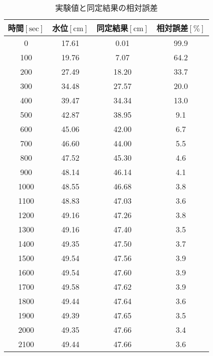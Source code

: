 \begin{table}[b]
  \begin{center}
    \caption{実験値と同定結果の相対誤差}
    \begin{tabular}{|c|c|c|c|} \hline
      時間$\mathrm{[sec]}$ & 水位$\mathrm{[cm]}$ & 同定結果$\mathrm{[cm]}$ & 相対誤差$\mathrm{[\%]}$ \\ \hline \hline
0	   & 17.61 & 0.01	 & 99.9 \\ \hline
100	 & 19.76 & 7.07	 & 64.2 \\ \hline
200	 & 27.49 & 18.20 & 33.7 \\ \hline
300	 & 34.48 & 27.57 & 20.0 \\ \hline
400	 & 39.47 & 34.34 & 13.0 \\ \hline
500	 & 42.87 & 38.95 &  9.1 \\ \hline
600	 & 45.06 & 42.00 &  6.7 \\ \hline
700	 & 46.60 & 44.00 &  5.5 \\ \hline
800	 & 47.52 & 45.30 &  4.6 \\ \hline
900	 & 48.14 & 46.14 &  4.1 \\ \hline
1000 & 48.55 & 46.68 &  3.8 \\ \hline
1100 & 48.83 & 47.03 &  3.6 \\ \hline
1200 & 49.16 & 47.26 &  3.8 \\ \hline
1300 & 49.16 & 47.40 &  3.5 \\ \hline
1400 & 49.35 & 47.50 &  3.7 \\ \hline
1500 & 49.54 & 47.56 &  3.9 \\ \hline
1600 & 49.54 & 47.60 &  3.9 \\ \hline
1700 & 49.58 & 47.62 &  3.9 \\ \hline
1800 & 49.44 & 47.64 &  3.6 \\ \hline
1900 & 49.39 & 47.65 &  3.5 \\ \hline
2000 & 49.35 & 47.66 &  3.4 \\ \hline
2100 & 49.44 & 47.66 &  3.6 \\ \hline
    \end{tabular}
    \label{tab:data4}
  \end{center}
\end{table}

